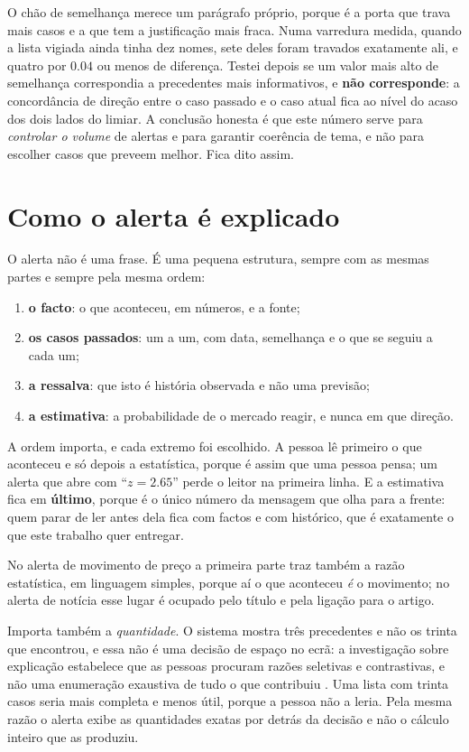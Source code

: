 O chão de semelhança merece um parágrafo próprio, porque é a porta que trava mais casos e a que
tem a justificação mais fraca. Numa varredura medida, quando a lista vigiada ainda tinha dez nomes,
sete deles foram travados exatamente ali, e quatro por $0.04$ ou menos de diferença. Testei depois se um valor mais alto de
semelhança correspondia a precedentes mais informativos, e \textbf{não corresponde}: a concordância
de direção entre o caso passado e o caso atual fica ao nível do acaso dos dois lados do limiar. A
conclusão honesta é que este número serve para \emph{controlar o volume} de alertas e para garantir
coerência de tema, e não para escolher casos que preveem melhor. Fica dito assim.

\section{Como o alerta é explicado}
\label{sec:sis_explicacao}

O alerta não é uma frase. É uma pequena estrutura, sempre com as mesmas partes e sempre pela mesma
ordem:

\begin{enumerate}
  \item \textbf{o facto}: o que aconteceu, em números, e a fonte;
  \item \textbf{os casos passados}: um a um, com data, semelhança e o que se seguiu a cada um;
  \item \textbf{a ressalva}: que isto é história observada e não uma previsão;
  \item \textbf{a estimativa}: a probabilidade de o mercado reagir, e nunca em que direção.
\end{enumerate}

A ordem importa, e cada extremo foi escolhido. A pessoa lê primeiro o que aconteceu e só depois a
estatística, porque é assim que uma pessoa pensa; um alerta que abre com ``$z = 2.65$'' perde o
leitor na primeira linha. E a estimativa fica em \textbf{último}, porque é o único número da
mensagem que olha para a frente: quem parar de ler antes dela fica com factos e com histórico, que
é exatamente o que este trabalho quer entregar.

No alerta de movimento de preço a primeira parte traz também a razão estatística, em linguagem
simples, porque aí o que aconteceu \emph{é} o movimento; no alerta de notícia esse lugar é
ocupado pelo título e pela ligação para o artigo.

Importa também a \emph{quantidade}. O sistema mostra três precedentes e não os trinta que encontrou,
e essa não é uma decisão de espaço no ecrã: a investigação sobre explicação estabelece que as pessoas
procuram razões seletivas e contrastivas, e não uma enumeração exaustiva de tudo o que contribuiu
\autocite{miller2019explanation}. Uma lista com trinta casos seria mais completa e menos útil, porque
a pessoa não a leria. Pela mesma razão o alerta exibe as quantidades exatas por detrás da decisão e
não o cálculo inteiro que as produziu.


